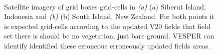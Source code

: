 \documentclass[hess, twostagejnl]{copernicus}
\providecommand{\DIFadd}[1]{{\protect\color{blue} \sf #1}} %
\providecommand{\DIFdel}[1]{{\protect\color{red} \scriptsize #1}} %
\providecommand{\DIFaddend}{} %
\providecommand{\DIFaddFL}[1]{\DIFadd{#1}} %
\providecommand{\DIFdelFL}[1]{\DIFdel{#1}} %
\providecommand{\DIFaddbeginFL}{} %
\providecommand{\DIFaddendFL}{} %
\providecommand{\DIFdelbeginFL}{} %
\providecommand{\DIFdelendFL}{} %
\begin{document}
{	}\DIFaddend \begin{figure}[h!]
	 \\
	\caption{Satellite imagery of \DIFdelbeginFL \DIFdelFL{grid boxes }\DIFdelendFL \DIFaddbeginFL \DIFaddFL{grid-cells }\DIFaddendFL in \DIFdelbeginFL \DIFdelFL{\textit{(a)} }\DIFdelendFL \DIFaddbeginFL \DIFaddFL{(a) }\DIFaddendFL Siberut Island, Indonesia and \DIFdelbeginFL \DIFdelFL{\textit{(b)} }\DIFdelendFL \DIFaddbeginFL \DIFaddFL{(b) }\DIFaddendFL South Island, New Zealand. For both \DIFdelbeginFL \DIFdelFL{points it is expected }\DIFdelendFL \DIFaddbeginFL \DIFaddFL{grid-cells }\DIFaddendFL according to the updated V20 \DIFdelbeginFL \DIFdelFL{fields that }\DIFdelendFL \DIFaddbeginFL \DIFaddFL{field set }\DIFaddendFL there \DIFdelbeginFL \DIFdelFL{is }\DIFdelendFL \DIFaddbeginFL \DIFaddFL{should be }\DIFaddendFL no vegetation, just bare ground. VESPER \DIFdelbeginFL \DIFdelFL{can identify }\DIFdelendFL \DIFaddbeginFL \DIFaddFL{identified }\DIFaddendFL these \DIFdelbeginFL \DIFdelFL{erroneous }\DIFdelendFL \DIFaddbeginFL \DIFaddFL{erroneously }\DIFaddendFL updated \DIFdelbeginFL \DIFdelFL{fields}\DIFdelendFL \DIFaddbeginFL \DIFaddFL{areas}\DIFaddendFL .} 
	\label{fig:cvh}
\end{figure}
\end{document}

